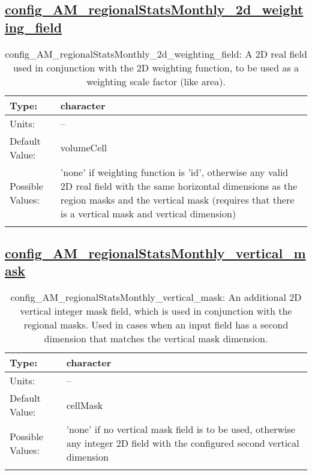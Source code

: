 \subsection[config\_AM\_regionalStatsMonthly\_2d\_weighting\_field]{\hyperref[sec:nm_tab_AM_regionalStatsMonthly]{config\_AM\_regionalStatsMonthly\_2d\_weighting\_field}}
\label{subsec:nm_sec_config_AM_regionalStatsMonthly_2d_weighting_field}
\begin{center}
\begin{longtable}{| p{2.0in} || p{4.0in} |}
    \hline
    Type: & character \\
    \hline
    Units: & -- \\
    \hline
    Default Value: & volumeCell \\
    \hline
    Possible Values: & 'none' if weighting function is 'id', otherwise any valid 2D real field with the same horizontal dimensions as the region masks and the vertical mask (requires that there is a vertical mask and vertical dimension) \\
    \hline
    \caption{config\_AM\_regionalStatsMonthly\_2d\_weighting\_field: A 2D real field used in conjunction with the 2D weighting function, to be used as a weighting scale factor (like area).}
\end{longtable}
\end{center}
\subsection[config\_AM\_regionalStatsMonthly\_vertical\_mask]{\hyperref[sec:nm_tab_AM_regionalStatsMonthly]{config\_AM\_regionalStatsMonthly\_vertical\_mask}}
\label{subsec:nm_sec_config_AM_regionalStatsMonthly_vertical_mask}
\begin{center}
\begin{longtable}{| p{2.0in} || p{4.0in} |}
    \hline
    Type: & character \\
    \hline
    Units: & -- \\
    \hline
    Default Value: & cellMask \\
    \hline
    Possible Values: & 'none' if no vertical mask field is to be used, otherwise any integer 2D field with the configured second vertical dimension \\
    \hline
    \caption{config\_AM\_regionalStatsMonthly\_vertical\_mask: An additional 2D vertical integer mask field, which is used in conjunction with the regional masks. Used in cases when an input field has a second dimension that matches the vertical mask dimension.}
\end{longtable}
\end{center}
